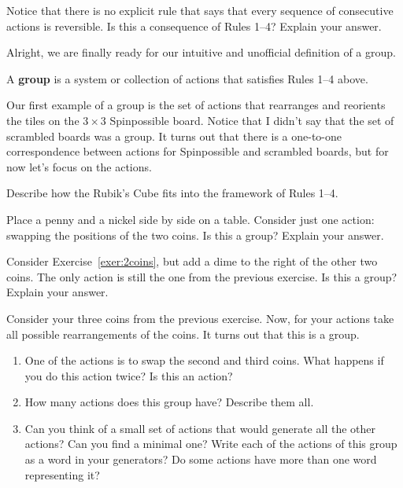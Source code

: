 \begin{exercise}
Notice that there is no explicit rule that says that every sequence of consecutive actions is reversible.  Is this a consequence of Rules 1--4?  Explain your answer.
\end{exercise}

Alright, we are finally ready for our intuitive and unofficial definition of a group.

\begin{intuitivedef}\label{def:informal_group}
A \textbf{group} is a system or collection of actions that satisfies Rules 1--4 above.
\end{intuitivedef}

Our first example of a group is the set of actions that rearranges and reorients the tiles on the $3\times 3$ Spinpossible board.  Notice that I didn't say that the set of scrambled boards was a group.  It turns out that there is a one-to-one correspondence between actions for Spinpossible and scrambled boards, but for now let's focus on the actions.

\begin{exercise}
Describe how the Rubik's Cube fits into the framework of Rules 1--4.
\end{exercise}

\begin{exercise}\label{exer:2coins}%
Place a penny and a nickel side by side on a table.  Consider just one action: swapping the positions of the two coins.  Is this a group?  Explain your answer.
\end{exercise}

\begin{exercise}
Consider Exercise~\ref{exer:2coins}, but add a dime to the right of the other two coins.  The only action is still the one from the previous exercise.  Is this a group?   Explain your answer.
\end{exercise}

\begin{exercise}
Consider your three coins from the previous exercise.  Now, for your actions take all possible rearrangements of the coins.  It turns out that this is a group.
\begin{enumerate}[label=\rm{(\alph*)}]
\item\label{do-nothing} One of the actions is to swap the second and third coins.  What happens if you do this action twice?  Is this an action?  
\item How many actions does this group have?  Describe them all.
\item Can you think of a small set of actions that would generate all the other actions?  Can you find a minimal one?  Write each of the actions of this group as a word in your generators?  Do some actions have more than one word representing it?
\end{enumerate}
\end{exercise}

